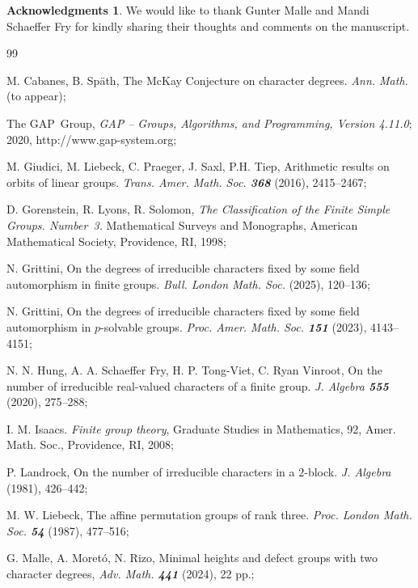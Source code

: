 \documentclass[12pt]{amsart}
\theoremstyle{theorem}
\theoremstyle{definition}
\newtheorem*{ack}{Acknowledgments}
\begin{document}
	\begin{ack}
		We would like to thank Gunter Malle and Mandi Schaeffer Fry for kindly sharing their thoughts and comments on the manuscript.
	\end{ack}
	
	\begin{thebibliography}{99}
		
		 {\sc M. Cabanes, B. Späth}, The McKay Conjecture on character degrees. \emph{Ann. Math.} (to appear);
		
		{\sc The GAP~Group}, \emph{GAP -- Groups, Algorithms, and Programming, Version
			4.11.0}; 2020, {\sf http://www.gap-system.org};
		
		{\sc M. Giudici, M. Liebeck, C. Praeger, J. Saxl, P.H. Tiep}, Arithmetic
		results on orbits of linear groups. \emph{Trans. Amer. Math. Soc. \bf368}
		(2016), 2415--2467;
		
		{\sc D. Gorenstein, R. Lyons, R. Solomon}, \emph{The Classification of the
			Finite Simple Groups. Number~3.} Mathematical Surveys and Monographs,
		American Mathematical Society, Providence, RI, 1998;
		
		{\sc N. Grittini}, On the degrees of irreducible characters fixed by
		some field automorphism in finite groups. \emph{Bull. London Math. Soc.} (2025), 120--136;
		
		{\sc N. Grittini}, On the degrees of irreducible characters fixed by some field automorphism in $p$-solvable groups. \emph{Proc. Amer. Math. Soc. {\bf 151}} (2023), 4143--4151;
		
		{\sc N. N. Hung, A. A. Schaeffer Fry, H. P. Tong-Viet, C. Ryan Vinroot}, On the number of irreducible real-valued characters of a finite group. \emph{J. Algebra \bf555} (2020), 275--288;
		
		{\sc I. M. Isaacs}. \emph{Finite group theory}, Graduate Studies in Mathematics, 92, Amer. Math. Soc., Providence, RI, 2008;
		
		{\sc P. Landrock}, On the number of irreducible characters in a $2$-block. \emph{J. Algebra} (1981), 426--442;
		
		{\sc M. W. Liebeck}, The affine permutation groups of rank three. \emph{Proc.
			London Math. Soc. {\bf54}} (1987), 477--516;
		
		 {\sc G. Malle, A. Moretó, N. Rizo}, Minimal heights and defect groups with two character degrees, \emph{Adv. Math. {\bf 441}} (2024), 22 pp.;
		

\end{thebibliography}
\end{document}
